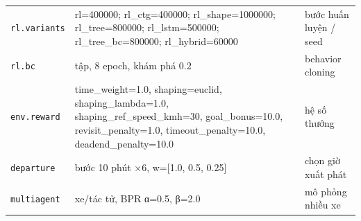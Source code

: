 \begin{table}[!htbp]
\begin{tabularx}{\linewidth}{>{\raggedright\arraybackslash}p{5.0cm}>{\raggedright\arraybackslash}X>{\raggedright\arraybackslash}p{3.0cm}}
\texttt{rl.variants} & rl=400000; rl\_ctg=400000; rl\_shape=1000000; rl\_tree=800000; rl\_lstm=500000; rl\_tree\_bc=800000; rl\_hybrid=60000 & bước huấn luyện / seed \\
\texttt{rl.bc} & 1500 tập, 8 epoch, khám phá 0.2 & behavior cloning \\
\texttt{env.reward} & time\_weight=1.0, shaping=euclid, shaping\_lambda=1.0, shaping\_ref\_speed\_kmh=30, goal\_bonus=10.0, revisit\_penalty=1.0, timeout\_penalty=10.0, deadend\_penalty=10.0 & hệ số thưởng \\
\texttt{departure} & bước 10 phút ×6, w=[1.0, 0.5, 0.25] & chọn giờ xuất phát \\
\texttt{multiagent} & 20 xe/tác tử, BPR α=0.5, β=2.0 & mô phỏng nhiều xe \\
\bottomrule
\end{tabularx}
\end{table}

